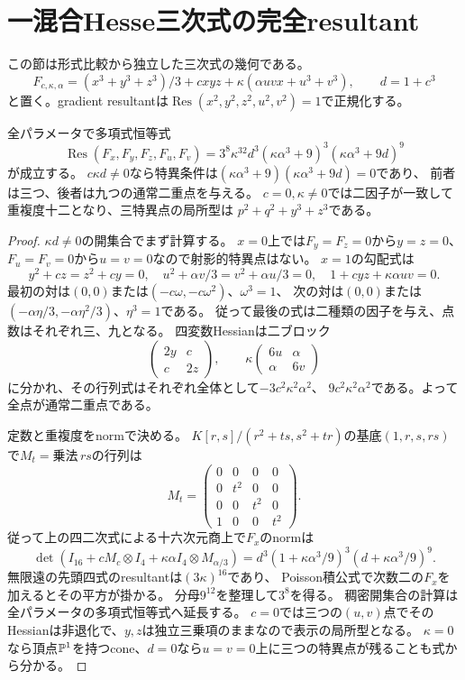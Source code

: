 \section{一混合Hesse三次式の完全resultant}
この節は形式比較から独立した三次式の幾何である。
\[
 F_{c,\kappa,\alpha}=(x^3+y^3+z^3)/3+cxyz+
 \kappa(\alpha uvx+u^3+v^3),\qquad d=1+c^3
\]
と置く。gradient resultantは$\operatorname{Res}(x^2,y^2,z^2,u^2,v^2)=1$で正規化する。
\begin{theorem}
全パラメータで多項式恒等式
\[
 \operatorname{Res}(F_x,F_y,F_z,F_u,F_v)
 =3^8\kappa^{32}d^3(\kappa\alpha^3+9)^3(\kappa\alpha^3+9d)^9
\]
が成立する。
$c\kappa d\ne0$なら特異条件は$(\kappa\alpha^3+9)(\kappa\alpha^3+9d)=0$であり、
前者は三つ、後者は九つの通常二重点を与える。
$c=0,\kappa\ne0$では二因子が一致して重複度十二となり、三特異点の局所型は
$p^2+q^2+y^3+z^3$である。
\end{theorem}
\begin{proof}
$\kappa d\ne0$の開集合でまず計算する。
$x=0$上では$F_y=F_z=0$から$y=z=0$、$F_u=F_v=0$から$u=v=0$なので射影的特異点はない。
$x=1$の勾配式は
\[
 y^2+cz=z^2+cy=0,\quad u^2+\alpha v/3=v^2+\alpha u/3=0,\quad
 1+cyz+\kappa\alpha uv=0.
\]
最初の対は$(0,0)$または$(-c\omega,-c\omega^2)$、$\omega^3=1$、
次の対は$(0,0)$または$(-\alpha\eta/3,-\alpha\eta^2/3)$、$\eta^3=1$である。
従って最後の式は二種類の因子を与え、点数はそれぞれ三、九となる。
四変数Hessianは二ブロック
\[
 \begin{pmatrix}2y&c\\c&2z\end{pmatrix},\qquad
 \kappa\begin{pmatrix}6u&\alpha\\\alpha&6v\end{pmatrix}
\]
に分かれ、その行列式はそれぞれ全体として$-3c^2\kappa^2\alpha^2$、
$9c^2\kappa^2\alpha^2$である。よって全点が通常二重点である。

定数と重複度をnormで決める。
$K[r,s]/(r^2+ts,s^2+tr)$の基底$(1,r,s,rs)$で$M_t=$乗法$\,rs$の行列は
\[
 M_t=\begin{pmatrix}0&0&0&0\\0&t^2&0&0\\0&0&t^2&0\\1&0&0&t^2\end{pmatrix}.
\]
従って上の四二次式による十六次元商上で$F_x$のnormは
\[
 \det(I_{16}+cM_c\otimes I_4+\kappa\alpha I_4\otimes M_{\alpha/3})
 =d^3(1+\kappa\alpha^3/9)^3(d+\kappa\alpha^3/9)^9.
\]
無限遠の先頭四式のresultantは$(3\kappa)^{16}$であり、
Poisson積公式\cite{Resultant}で次数二の$F_x$を加えるとその平方が掛かる。
分母$9^{12}$を整理して$3^8$を得る。
稠密開集合の計算は全パラメータの多項式恒等式へ延長する。
$c=0$では三つの$(u,v)$点でそのHessianは非退化で、$y,z$は独立三乗項のままなので表示の局所型となる。
$\kappa=0$なら頂点$\mathbb P^1$を持つcone、$d=0$なら$u=v=0$上に三つの特異点が残ることも式から分かる。
\end{proof}

